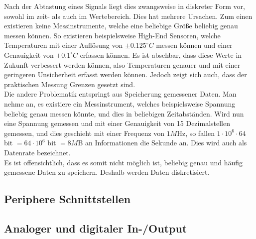 Nach der Abtastung eines Signals liegt dies zwangsweise in diskreter Form vor, sowohl im zeit- als auch im Wertebereich. Dies hat mehrere Ursachen. Zum einen existieren keine Messinstrumente, welche eine beliebige Größe beliebig genau messen können. So existieren beispielsweise High-End Sensoren, welche Temperaturen mit einer Auflösung von $\pm0.125^\circ C$ messen können und einer Genauigkeit von $\pm0.1^\circ C$ erfassen können. Es ist absehbar, dass diese Werte in Zukunft verbessert werden können, also Temperaturen genauer und mit einer geringeren Unsicherheit erfasst werden können. Jedoch zeigt sich auch, dass der praktischen Messung Grenzen gesetzt sind.\\
Die andere Problematik entspringt aus Speicherung gemessener Daten. Man nehme an, es existiere ein Messinstrument, welches beispielsweise Spannung beliebig genau messen könnte, und dies in beliebigen Zeitabständen. Wird nun eine Spannung gemessen und mit einer Genauigkeit von 15 Dezimalstellen gemessen, und dies geschieht mit einer Frequenz von $1M$Hz, so fallen $1 \cdot 10^6 \cdot 64$ bit $= 64 \cdot 10^6$ bit $= 8M$B an Informationen die Sekunde an. Dies wird auch als Datenrate bezeichnet.\\
Es ist offensichtlich, dass es somit nicht möglich ist, beliebig genau und häufig gemessene Daten zu speichern. Deshalb werden Daten diskretisiert.\\

\subsection{Periphere Schnittstellen}\label{3.4}
\subsection{Analoger und digitaler In-/Output}\label{3.5}